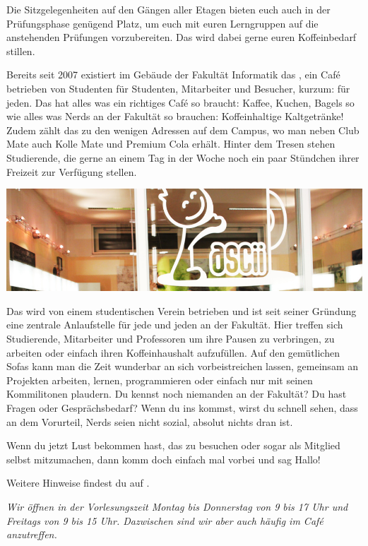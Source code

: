 Die Sitzgelegenheiten auf den Gängen aller Etagen bieten euch auch in der Prüfungsphase genügend Platz, um euch mit euren Lerngruppen auf die anstehenden Prüfungen vorzubereiten. Das \ascii{} wird dabei gerne euren Koffeinbedarf stillen.


Bereits seit 2007 existiert im Gebäude der Fakultät Informatik das \ascii{}, ein Café betrieben von Studenten für Studenten, Mitarbeiter und Besucher, kurzum: für jeden.
Das \ascii{} hat alles was ein richtiges Café so braucht: Kaffee, Kuchen, Bagels so wie alles was Nerds an der Fakultät so brauchen: Koffeinhaltige Kaltgetränke!
Zudem zählt das \ascii{} zu den wenigen Adressen auf dem Campus, wo man neben Club Mate auch Kolle Mate und Premium Cola erhält.
Hinter dem Tresen stehen Studierende, die gerne an einem Tag in der Woche noch ein paar Stündchen ihrer Freizeit zur Verfügung stellen.

\includegraphics[width=\linewidth]{img/ascii.jpg}

Das \ascii{} wird von einem studentischen Verein betrieben und ist seit seiner Gründung eine zentrale Anlaufstelle für jede und jeden an der Fakultät.
Hier treffen sich Studierende, Mitarbeiter und Professoren um ihre Pausen zu verbringen,
zu arbeiten oder einfach ihren Koffeinhaushalt aufzufüllen.
Auf den gemütlichen Sofas kann man die Zeit wunderbar an sich vorbeistreichen lassen,
gemeinsam an Projekten arbeiten, lernen, programmieren oder einfach nur mit seinen Kommilitonen plaudern.
Du kennst noch niemanden an der Fakultät?
Du hast Fragen oder Gesprächsbedarf?
Wenn du ins \ascii{} kommst, wirst du schnell sehen, dass an dem Vorurteil, Nerds seien nicht sozial, absolut nichts dran ist.

Wenn du jetzt Lust bekommen hast, das \ascii{} zu besuchen oder sogar als Mitglied selbst mitzumachen, dann komm doch einfach mal vorbei und sag Hallo!

Weitere Hinweise findest du auf .

\textit{Wir öffnen in der Vorlesungszeit Montag bis Donnerstag von 9 bis 17 Uhr und Freitags von 9 bis 15 Uhr. Dazwischen sind wir aber auch häufig im Café anzutreffen.}
